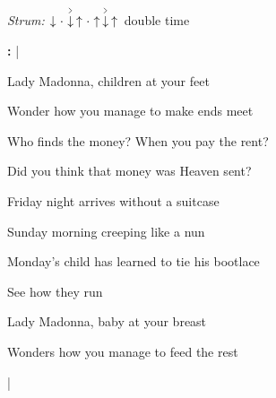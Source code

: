 \begin{song}


\begin{headerbox}
\RaiseBoxWithAccents
{} \quad
\textit{Strum:} $\Down\Miss\AccentDown\Up\Miss\Up\AccentDown\Up$ double time
\end{headerbox}

\begin{hchordbox}
\smaller
{}
\end{hchordbox}

\bigskip

\Large

\Intro\textbf{:}     |      \par

\bigskip

Lady Madonna, children at your feet \par
{}Wonder how you manage to make ends meet \par
{}Who finds the money? When you pay the rent? \par
{}Did you think that money was Heaven sent? \par

\bigskip

Friday night arrives without a suitcase \par
{}Sunday morning creeping like a nun \par
{}Monday's child has learned to tie his bootlace \par
{}See how they run \par

\bigskip

Lady Madonna, baby at your breast \par
{}Wonders how you manage to feed the rest \par

\bigskip

    |      \par


\end{song}
